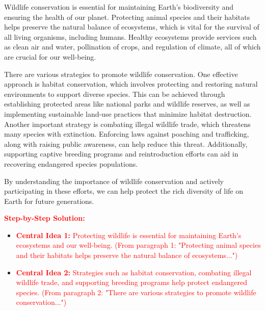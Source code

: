 \documentclass[12pt]{article}
\begin{document}
\begin{tcolorbox}[colframe=black!60, colback=white, 
coltitle=black, colbacktitle=black!15, fonttitle=\bfseries\Large, 
title=Text: Wildlife Conservation, halign title=center, left=10pt, right=10pt, bottom=15pt]
Wildlife conservation is essential for maintaining Earth's biodiversity and ensuring the health of our planet. Protecting animal species and their habitats helps preserve the natural balance of ecosystems, which is vital for the survival of all living organisms, including humans. Healthy ecosystems provide services such as clean air and water, pollination of crops, and regulation of climate, all of which are crucial for our well-being.

There are various strategies to promote wildlife conservation. One effective approach is habitat conservation, which involves protecting and restoring natural environments to support diverse species. This can be achieved through establishing protected areas like national parks and wildlife reserves, as well as implementing sustainable land-use practices that minimize habitat destruction. Another important strategy is combating illegal wildlife trade, which threatens many species with extinction. Enforcing laws against poaching and trafficking, along with raising public awareness, can help reduce this threat. Additionally, supporting captive breeding programs and reintroduction efforts can aid in recovering endangered species populations.

By understanding the importance of wildlife conservation and actively participating in these efforts, we can help protect the rich diversity of life on Earth for future generations.

\textcolor{red}{\textbf{Step-by-Step Solution:}}
\begin{itemize}
    \item \textcolor{red}{\textbf{Central Idea 1:} Protecting wildlife is essential for maintaining Earth's ecosystems and our well-being. (From paragraph 1: "Protecting animal species and their habitats helps preserve the natural balance of ecosystems...")}  
    \item \textcolor{red}{\textbf{Central Idea 2:} Strategies such as habitat conservation, combating illegal wildlife trade, and supporting breeding programs help protect endangered species. (From paragraph 2: "There are various strategies to promote wildlife conservation...")}  
\end{itemize}
\end{tcolorbox}
\end{document}
